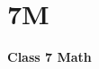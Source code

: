 \label{2 C7 Math}
    \section{7M}
    \begin{frame}
    \begin{center}
    \begin{Huge}
        \textbf{Class 7 Math}
    \end{Huge}
    \end{center}
    \end{frame}
 
    